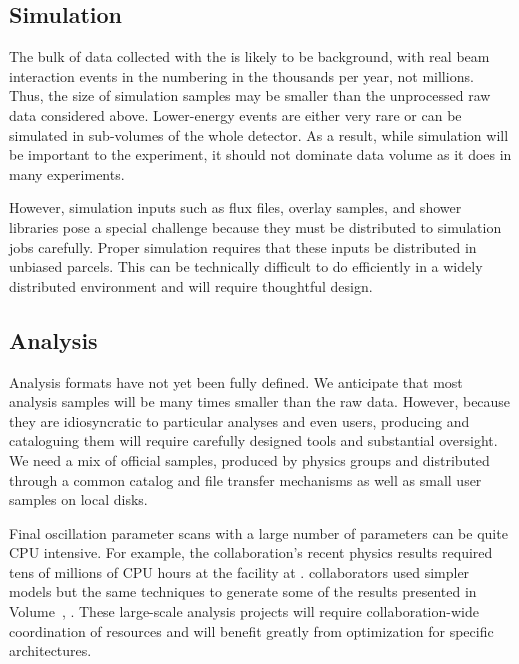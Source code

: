 \subsection{Simulation}
The bulk of data collected with the  is likely to be background, with real beam interaction events in the  numbering in the thousands per year, not millions. Thus, the size of simulation samples may be %
smaller than the unprocessed raw data considered above.  Lower-energy events are either very rare or can be simulated in sub-volumes of the whole detector.  As a result, while simulation will be important to the experiment, it should not dominate data volume as it does in many experiments.  

However, simulation inputs such as flux files, overlay samples, and shower libraries pose a special challenge because they must be distributed to simulation jobs carefully.   Proper simulation requires that these inputs be distributed in unbiased parcels.  This can be technically difficult to do efficiently in a widely distributed environment and will require thoughtful design. 

\subsection{Analysis}

Analysis formats have not yet been fully defined.  We anticipate that most analysis samples will be many times smaller than the raw data.  However, because they are idiosyncratic to particular analyses and even users,  producing and cataloguing them will require carefully designed tools and substantial oversight. 
We need a mix of official samples, produced by physics groups and distributed through a common catalog and file transfer mechanisms as well as small user samples on local disks. 

Final oscillation parameter scans with a large number of %
parameters can be quite CPU intensive.  For example, the  collaboration's recent physics results required tens of millions of   CPU hours at the  %
facility at .  collaborators used simpler models but the same techniques to generate some of the results presented in Volume~\volnumberphysics{}, \voltitlephysics{}. These large-scale analysis projects will require collaboration-wide coordination of resources and will benefit greatly from optimization for specific architectures.

